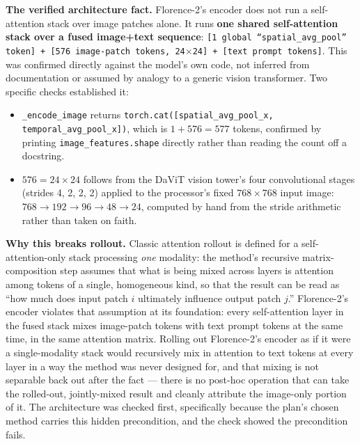 \textbf{The verified architecture fact.} Florence-2's encoder does not run a self-attention stack
over image patches alone. It runs \textbf{one shared self-attention stack over a fused
image+text sequence}: \texttt{[1 global ``spatial\_avg\_pool'' token] + [576 image-patch tokens,
24$\times$24] + [text prompt tokens]}. This was confirmed directly against the model's own code,
not inferred from documentation or assumed by analogy to a generic vision transformer. Two
specific checks established it:

\begin{itemize}
\item \texttt{\_encode\_image} returns \texttt{torch.cat([spatial\_avg\_pool\_x,
temporal\_avg\_pool\_x])}, which is $1 + 576 = 577$ tokens, confirmed by printing
\texttt{image\_features.shape} directly rather than reading the count off a docstring.
\item $576 = 24 \times 24$ follows from the DaViT vision tower's four convolutional stages
(strides 4, 2, 2, 2) applied to the processor's fixed $768 \times 768$ input image: $768 \to 192
\to 96 \to 48 \to 24$, computed by hand from the stride arithmetic rather than taken on faith.
\end{itemize}

\textbf{Why this breaks rollout.} Classic attention rollout \citep{abnar2020rollout} is defined
for a self-attention-only stack processing \emph{one} modality: the method's recursive
matrix-composition step assumes that what is being mixed across layers is attention among tokens
of a single, homogeneous kind, so that the result can be read as ``how much does input patch $i$
ultimately influence output patch $j$.'' Florence-2's encoder violates that assumption at its
foundation: every self-attention layer in the fused stack mixes image-patch tokens with text
prompt tokens at the same time, in the same attention matrix. Rolling out Florence-2's encoder
as if it were a single-modality stack would recursively mix in attention to text tokens at every
layer in a way the method was never designed for, and that mixing is not separable back out after
the fact --- there is no post-hoc operation that can take the rolled-out, jointly-mixed result and
cleanly attribute the image-only portion of it. The architecture was checked first, specifically
because the plan's chosen method carries this hidden precondition, and the check showed the
precondition fails.

